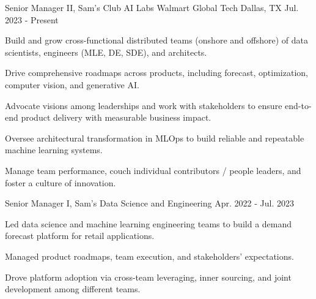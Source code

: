 

\begin{cventries}

	\cventry
		{Senior Manager II, Sam's Club AI Labs} %
		{Walmart Global Tech} %
		{Dallas, TX} %
		{Jul. 2023 - Present} %
		{
			\begin{cvitems} %
				\item {Build and grow cross-functional distributed teams (onshore and offshore) of data scientists, engineers (MLE, DE, SDE), and architects.}
				\item {Drive comprehensive roadmaps across products, including forecast, optimization, computer vision, and generative AI.}
				\item {Advocate visions among leaderships and work with stakeholders to ensure end-to-end product delivery with measurable business impact.}
				\item {Oversee architectural transformation in MLOps to build reliable and repeatable machine learning systems.}
				\item {Manage team performance, couch individual contributors / people leaders, and foster a culture of innovation.}
			\end{cvitems}
		}

	\cventry
		{Senior Manager I, Sam's Data Science and Engineering} %
		{} %
		{} %
		{Apr. 2022 - Jul. 2023} %
		{
				\begin{cvitems} %
						\item {Led data science and machine learning engineering teams to build a demand forecast platform for retail applications.}
						\item {Managed product roadmaps, team execution, and stakeholders' expectations.}
						\item {Drove platform adoption via cross-team leveraging, inner sourcing, and joint development among different teams.}
				\end{cvitems}
	}



\end{cventries}
